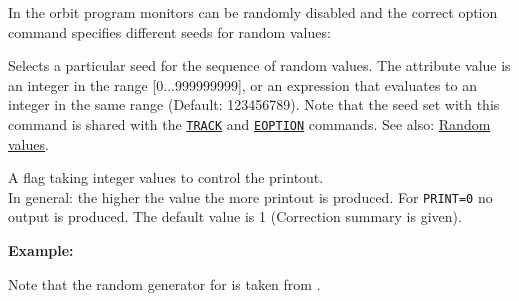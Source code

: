 
In the orbit program monitors can be randomly disabled and the correct
option command specifies different seeds for random values:  

\begin{madlist}
    Selects a particular seed for the sequence of random values. 
     The attribute value is an integer in the range [0...999999999], or
     an expression that evaluates to an integer in the same range 
     (Default: 123456789). Note that the seed set with this command is shared with the \hyperref[sec:track]{\texttt{TRACK}} and \hyperref[sec:eoption]{\texttt{EOPTION}} commands.
     See also: \hyperref[subsubsec:random]{Random values}.
     
    A flag taking integer values to control the printout. 
     \\ In general: the higher the value the more printout is produced.  
     For \texttt{PRINT=0} no output is produced. 
     The default value is 1 (Correction summary is given). 
\end{madlist}

\textbf{Example:}

Note that the random generator for \mad is taken from \cite{knuth1981}.

